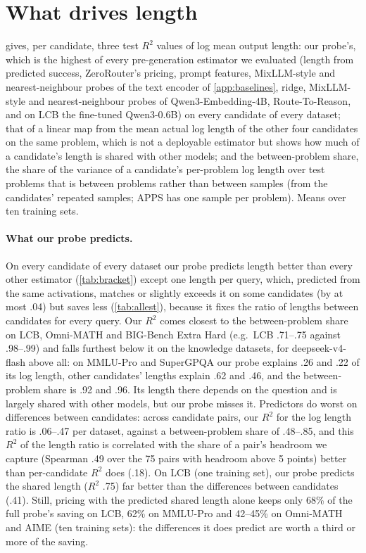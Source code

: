 \documentclass[10pt]{article}
\begin{document}
\FloatBarrier
\section{What drives length}\label{app:mechanism}
 gives, per candidate, three test $R^2$ values of log mean output length: our probe's, which is the highest of every pre-generation estimator we evaluated (length from predicted success, ZeroRouter's pricing, prompt features, MixLLM-style and nearest-neighbour probes of the text encoder of \cref{app:baselines}, ridge, MixLLM-style and nearest-neighbour probes of Qwen3-Embedding-4B, Route-To-Reason, and on LCB the fine-tuned Qwen3-0.6B) on every candidate of every dataset; that of a linear map from the mean actual log length of the other four candidates on the same problem, which is not a deployable estimator but shows how much of a candidate's length is shared with other models; and the between-problem share, the share of the variance of a candidate's per-problem log length over test problems that is between problems rather than between samples (from the candidates' repeated samples; APPS has one sample per problem). Means over ten training sets.

\paragraph{What our probe predicts.}
On every candidate of every dataset our probe predicts length better than every other estimator (\cref{tab:bracket}) except one length per query, which, predicted from the same activations, matches or slightly exceeds it on some candidates (by at most .04) but saves less (\cref{tab:allest}), because it fixes the ratio of lengths between candidates for every query. Our $R^2$ comes closest to the between-problem share on LCB, Omni-MATH and BIG-Bench Extra Hard (e.g.\ LCB .71--.75 against .98--.99) and falls furthest below it on the knowledge datasets, for deepseek-v4-flash above all: on MMLU-Pro and SuperGPQA our probe explains .26 and .22 of its log length, other candidates' lengths explain .62 and .46, and the between-problem share is .92 and .96. Its length there depends on the question and is largely shared with other models, but our probe misses it. Predictors do worst on differences between candidates: across candidate pairs, our $R^2$ for the log length ratio is .06--.47 per dataset, against a between-problem share of .48--.85, and this $R^2$ of the length ratio is correlated with the share of a pair's headroom we capture (Spearman .49 over the 75 pairs with headroom above 5 points) better than per-candidate $R^2$ does (.18). On LCB (one training set), our probe predicts the shared length ($R^2$ .75) far better than the differences between candidates (.41). Still, pricing with the predicted shared length alone keeps only 68\% of the full probe's saving on LCB, 62\% on MMLU-Pro and 42--45\% on Omni-MATH and AIME (ten training sets): the differences it does predict are worth a third or more of the saving.
\end{document}
